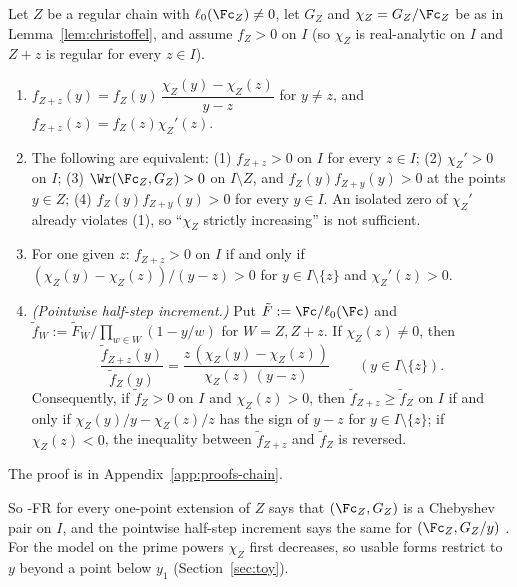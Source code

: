 \begin{proposition}\label{prop:chebyshev}
Let $Z$ be a regular chain with $\ell_0(\Fc_Z)\ne0$, let $G_Z$ and $\chi_Z=G_Z/\Fc_Z$ be as in
Lemma~\ref{lem:christoffel}, and assume $f_Z>0$ on $I$ (so $\chi_Z$ is real-analytic on $I$ and $Z+z$ is regular for
every $z\in I$).
\begin{enumerate}[label=(\alph*),leftmargin=2em]
\item $f_{Z+z}(y)=f_Z(y)\,\dfrac{\chi_Z(y)-\chi_Z(z)}{y-z}$ for $y\ne z$, and $f_{Z+z}(z)=f_Z(z)\chi_Z'(z)$.
\item The following are equivalent: (1) $f_{Z+z}>0$ on $I$ for every $z\in I$; (2) $\chi_Z'>0$ on $I$;
(3) $\Wr(\Fc_Z,G_Z)>0$ on $I\setminus Z$, and $f_Z(y)f_{Z+y}(y)>0$ at the points $y\in Z$;
(4) $f_Z(y)f_{Z+y}(y)>0$ for every $y\in I$. An isolated zero of $\chi_Z'$ already violates (1), so ``$\chi_Z$
strictly increasing'' is not sufficient.
\item For one given $z$: $f_{Z+z}>0$ on $I$ if and only if $(\chi_Z(y)-\chi_Z(z))/(y-z)>0$ for $y\in I\setminus\{z\}$
and $\chi_Z'(z)>0$.
\item \emph{(Pointwise half-step increment.)} Put $\tilde F:=\Fc/\ell_0(\Fc)$ and
$\tilde f_W:=\tilde F_W/\prod_{w\in W}(1-y/w)$ for $W=Z,Z+z$. If $\chi_Z(z)\ne0$, then
\[
\frac{\tilde f_{Z+z}(y)}{\tilde f_Z(y)}=\frac{z\,(\chi_Z(y)-\chi_Z(z))}{\chi_Z(z)\,(y-z)}\qquad(y\in I\setminus\{z\}).
\]
Consequently, if $\tilde f_Z>0$ on $I$ and $\chi_Z(z)>0$, then $\tilde f_{Z+z}\ge\tilde f_Z$ on $I$ if and only if
$\chi_Z(y)/y-\chi_Z(z)/z$ has the sign of $y-z$ for $y\in I\setminus\{z\}$; if $\chi_Z(z)<0$, the inequality
between $\tilde f_{Z+z}$ and $\tilde f_Z$ is reversed.
\end{enumerate}
\end{proposition}

The proof is in Appendix~\ref{app:proofs-chain}.

So \hyp{FR} for every one-point extension of $Z$ says that $(\Fc_Z,G_Z)$ is a Chebyshev pair on $I$, and the
pointwise half-step increment says the same for $(\Fc_Z,G_Z/y)$ \cite{KS66}. For the model on the prime powers
$\chi_Z$ first decreases, so usable forms restrict to $y$ beyond a point below $y_1$
(Section~\ref{sec:toy}).

